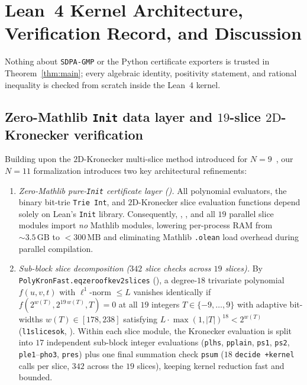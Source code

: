 \documentclass[11pt,reqno]{amsart}
\renewcommand{\_}{\origunderscore\allowbreak}
\theoremstyle{definition}
\begin{document}
\section{Lean~4 Kernel Architecture, Verification Record, and Discussion}\label{sec:lean}

Nothing about \texttt{SDPA-GMP} or the Python certificate exporters is trusted in Theorem~\ref{thm:main}; every algebraic identity, positivity statement, and rational inequality is checked from scratch inside the Lean~4 kernel.

\subsection{Zero-Mathlib \texorpdfstring{\texttt{Init}}{Init} data layer and \texorpdfstring{$19$}{19}-slice \texorpdfstring{$2\text{D}$}{2D}-Kronecker verification}\label{subsec:arch}
Building upon the $2\text{D}$-Kronecker multi-slice method introduced for $N = 9$~\cite{Li2026N9}, our $N = 11$ formalization introduces two key architectural refinements:
\begin{enumerate}[leftmargin=2.2em]
  \item \emph{Zero-Mathlib pure-\texttt{Init} certificate layer ().} All polynomial evaluators, the binary bit-trie \texttt{Trie Int}, and $2\text{D}$-Kronecker slice evaluation functions depend solely on Lean's \texttt{Init} library. Consequently, , , and all $19$ parallel slice modules  import \emph{no} Mathlib modules, lowering per-process RAM from $\sim 3.5\,\mathrm{GB}$ to $< 300\,\mathrm{MB}$ and eliminating Mathlib \texttt{.olean} load overhead during parallel compilation.
  \item \emph{Sub-block slice decomposition ($342$ slice checks across $19$ slices).} By \texttt{PolyKronFast.eq\_zero\_of\_kev2\_slices} (), a degree-$18$ trivariate polynomial $f(u,v,t)$ with $\ell^1$-norm $\le L$ vanishes identically if $f(2^{w(T)}, 2^{19\,w(T)}, T) = 0$ at all $19$ integers $T \in \{-9,\dots,9\}$ with adaptive bit-widths $w(T) \in [178, 238]$ satisfying $L \cdot \max(1,|T|)^{18} < 2^{w(T)}$ (\texttt{l1\_slices\_ok}, ). Within each slice module, the Kronecker evaluation is split into $17$ independent sub-block integer evaluations (\texttt{p\_lhs}, \texttt{p\_plain}, \texttt{p\_s1}, \texttt{p\_s2}, \texttt{p\_le1}--\texttt{p\_ho3}, \texttt{p\_res}) plus one final summation check \texttt{p\_sum} ($18$ \texttt{decide +kernel} calls per slice, $342$ across the $19$ slices), keeping kernel reduction fast and bounded.
\end{enumerate}
\end{document}
